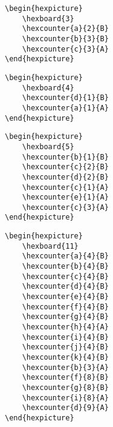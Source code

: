 \documentclass[a4paper,12pt]{article}
\begin{document}
    \begin{hexpicture}
    \end{hexpicture}

    \begin{verbatim}\begin{hexpicture}
    \hexboard{3}
    \hexcounter{a}{2}{B}
    \hexcounter{b}{3}{B}
    \hexcounter{c}{3}{A}
\end{hexpicture}\end{verbatim}

    \begin{hexpicture}
    \end{hexpicture}

    \begin{verbatim}\begin{hexpicture}
    \hexboard{4}
    \hexcounter{d}{1}{B}
    \hexcounter{a}{1}{A}
\end{hexpicture}\end{verbatim}

    \begin{hexpicture}
    \end{hexpicture}

    \begin{verbatim}\begin{hexpicture}
    \hexboard{5}
    \hexcounter{b}{1}{B}
    \hexcounter{c}{2}{B}
    \hexcounter{d}{2}{B}
    \hexcounter{c}{1}{A}
    \hexcounter{e}{1}{A}
    \hexcounter{c}{3}{A}
\end{hexpicture}\end{verbatim}

    \begin{hexpicture}
    \end{hexpicture}

    \begin{verbatim}\begin{hexpicture}
    \hexboard{11}
    \hexcounter{a}{4}{B}
    \hexcounter{b}{4}{B}
    \hexcounter{c}{4}{B}
    \hexcounter{d}{4}{B}
    \hexcounter{e}{4}{B}
    \hexcounter{f}{4}{B}
    \hexcounter{g}{4}{B}
    \hexcounter{h}{4}{A}
    \hexcounter{i}{4}{B}
    \hexcounter{j}{4}{B}
    \hexcounter{k}{4}{B}
    \hexcounter{b}{3}{A}
    \hexcounter{f}{8}{B}
    \hexcounter{g}{8}{B}
    \hexcounter{i}{8}{A}
    \hexcounter{d}{9}{A}
\end{hexpicture}\end{verbatim}
\end{document}

